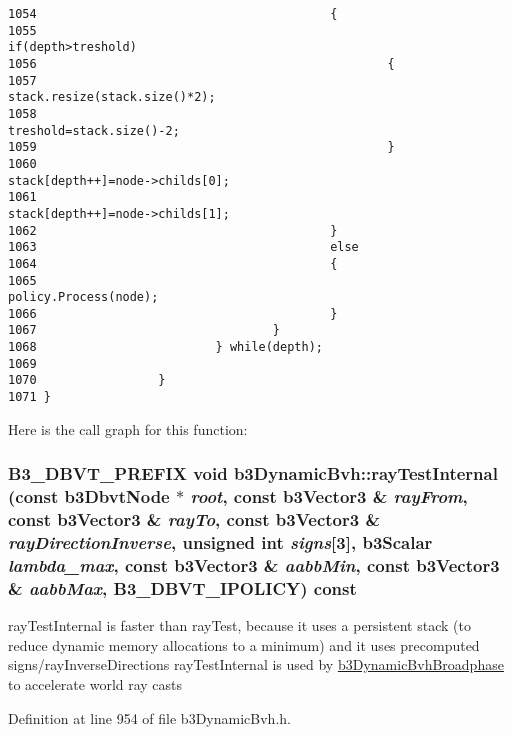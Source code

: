 \begin{Code}
\begin{verbatim}
1054                                         {
1055                                                 if(depth>treshold)
1056                                                 {
1057                                                         stack.resize(stack.size()*2);
1058                                                         treshold=stack.size()-2;
1059                                                 }
1060                                                 stack[depth++]=node->childs[0];
1061                                                 stack[depth++]=node->childs[1];
1062                                         }
1063                                         else
1064                                         {
1065                                                 policy.Process(node);
1066                                         }
1067                                 }
1068                         } while(depth);
1069 
1070                 }
1071 }
\end{verbatim}
\end{Code}




Here is the call graph for this function:\hypertarget{structb3_dynamic_bvh_164303efd5eac767e608b09526734b59}{
\subsubsection[rayTestInternal]{\setlength{\rightskip}{0pt plus 5cm}B3\_\-DBVT\_\-PREFIX void b3DynamicBvh::rayTestInternal (const b3DbvtNode $\ast$ {\em root}, \/  const b3Vector3 \& {\em rayFrom}, \/  const b3Vector3 \& {\em rayTo}, \/  const b3Vector3 \& {\em rayDirectionInverse}, \/  unsigned int {\em signs}\mbox{[}3\mbox{]}, \/  b3Scalar {\em lambda\_\-max}, \/  const b3Vector3 \& {\em aabbMin}, \/  const b3Vector3 \& {\em aabbMax}, \/  B3\_\-DBVT\_\-IPOLICY) const}}
\label{structb3_dynamic_bvh_164303efd5eac767e608b09526734b59}


rayTestInternal is faster than rayTest, because it uses a persistent stack (to reduce dynamic memory allocations to a minimum) and it uses precomputed signs/rayInverseDirections rayTestInternal is used by \hyperlink{structb3_dynamic_bvh_broadphase}{b3DynamicBvhBroadphase} to accelerate world ray casts 

Definition at line 954 of file b3DynamicBvh.h.

